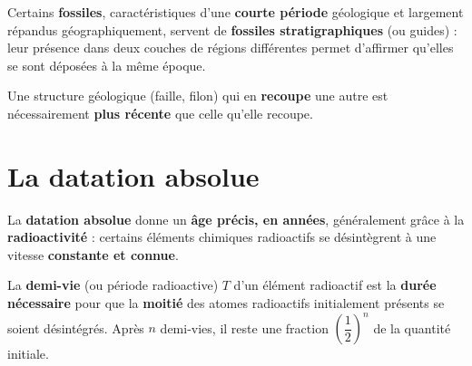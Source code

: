 \begin{propriete}
Certains \textbf{fossiles}, caractéristiques d'une \textbf{courte période} géologique et
largement répandus géographiquement, servent de \textbf{fossiles stratigraphiques} (ou
guides) : leur présence dans deux couches de régions différentes permet d'affirmer
qu'elles se sont déposées à la même époque.
\end{propriete}

\begin{propriete}
Une structure géologique (faille, filon) qui en \textbf{recoupe} une autre est
nécessairement \textbf{plus récente} que celle qu'elle recoupe.
\end{propriete}

\section{La datation absolue}

\begin{definition}
La \textbf{datation absolue} donne un \textbf{âge précis, en années}, généralement grâce
à la \textbf{radioactivité} : certains éléments chimiques radioactifs se désintègrent à
une vitesse \textbf{constante et connue}.
\end{definition}

\begin{definition}
La \textbf{demi-vie} (ou période radioactive) $T$ d'un élément radioactif est la
\textbf{durée nécessaire} pour que la \textbf{moitié} des atomes radioactifs initialement
présents se soient désintégrés. Après $n$ demi-vies, il reste une fraction
$\left(\dfrac12\right)^n$ de la quantité initiale.
\end{definition}

\begin{illus}
\end{illus}

